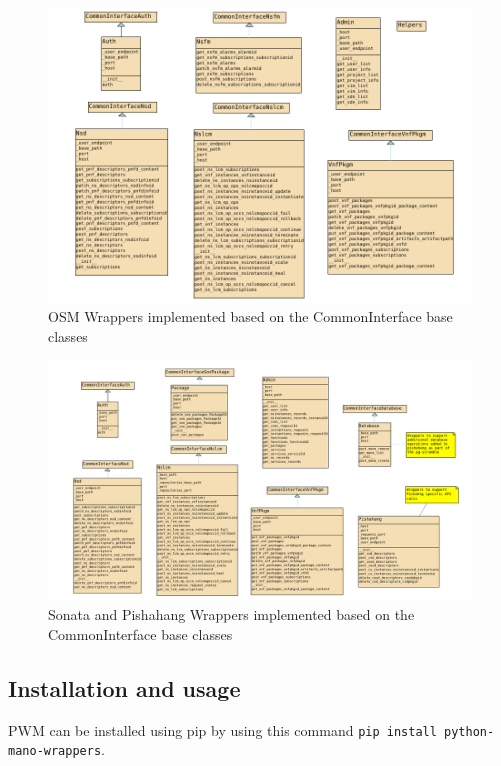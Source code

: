 \begin{figure}
	\centering
	\includegraphics[width=1\linewidth]{figures/osm_class_diagram}
	\caption{OSM Wrappers implemented based on the CommonInterface base classes}
	\label{fig:osmclassdiagram}
\end{figure}

\begin{figure}
	\centering
	\includegraphics[width=1\linewidth]{figures/pishahang_class_diagram}
	\caption{Sonata and Pishahang Wrappers implemented based on the CommonInterface base classes}
	\label{fig:pishahangclassdiagram}
\end{figure}


\subsection{Installation and usage}

PWM can be installed using pip by using this command \texttt{pip install python-mano-wrappers}. 


